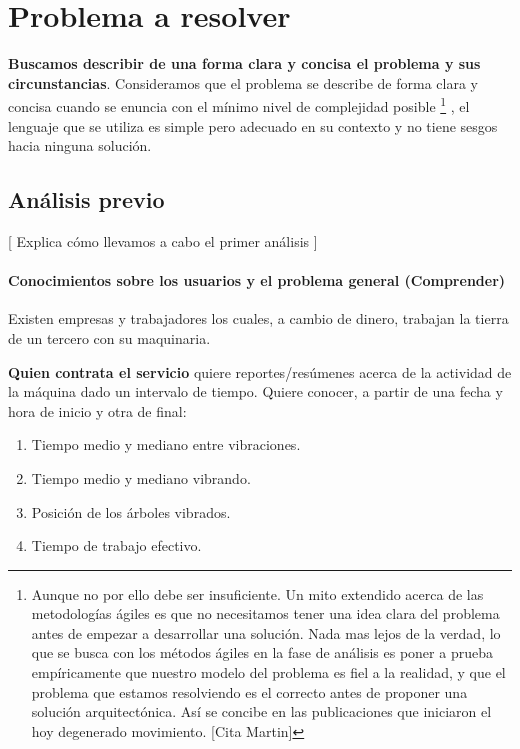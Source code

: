 \chapter{Problema a resolver}

\textbf{Buscamos describir de una forma clara y concisa el problema y sus
circunstancias}. Consideramos que el problema se describe de forma clara y
concisa cuando se enuncia con el mínimo nivel de complejidad posible%
%
\footnote{Aunque
no por ello debe ser insuficiente. Un mito extendido acerca de las metodologías ágiles
es que no necesitamos tener una idea clara del problema antes de empezar a desarrollar
una solución. Nada mas lejos de la verdad, lo que se busca con los métodos ágiles en la
fase de análisis es poner a prueba empíricamente que nuestro modelo del problema es fiel
a la realidad, y que el problema que estamos resolviendo es el correcto antes de proponer
una solución arquitectónica. Así se concibe en las publicaciones que iniciaron el hoy
degenerado movimiento. [Cita Martin]
}%
, el lenguaje que se utiliza es simple pero adecuado
en su contexto y no tiene sesgos hacia ninguna solución.

\section{Análisis previo}

[ Explica cómo llevamos a cabo el primer análisis ]

\subsubsection{Conocimientos sobre los usuarios y el problema general (Comprender)}

Existen empresas y trabajadores los cuales, a cambio de dinero, trabajan la
tierra de un tercero con su maquinaria.

\textbf{Quien contrata el servicio} quiere reportes/resúmenes acerca de la actividad
de la máquina dado un intervalo de tiempo. Quiere conocer, a partir de una fecha y hora de inicio y otra de final:

\begin{enumerate}
   \item Tiempo medio y mediano entre vibraciones.
   \item Tiempo medio y mediano vibrando.
   \item Posición de los árboles vibrados.
   \item Tiempo de trabajo efectivo.
\end{enumerate}

